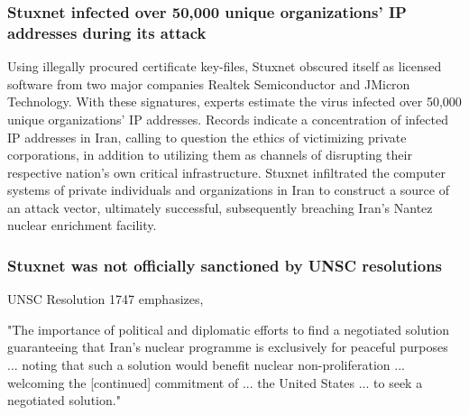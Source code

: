 \documentclass[12pt]{article}
\begin{document}
\begin{multicols}{2}

\subsubsection{Stuxnet infected over 50,000 unique organizations' IP addresses during its attack}

Using illegally procured certificate key-files, Stuxnet obscured itself as licensed software from two major companies Realtek Semiconductor and JMicron Technology. With these signatures, experts estimate the virus infected over 50,000 unique organizations' IP addresses.\cite{lessonsFromStuxnet} Records indicate a concentration of infected IP addresses in Iran, calling to question the ethics of victimizing private corporations, in addition to  utilizing them as channels of disrupting their respective nation's own critical infrastructure. Stuxnet infiltrated the computer systems of private individuals and organizations in Iran to construct a source of an attack vector, ultimately successful, subsequently breaching Iran's Nantez nuclear enrichment facility.\cite{w32.stuxnetDossier} 

\subsubsection{Stuxnet was not officially sanctioned by UNSC resolutions}

UNSC Resolution 1747 emphasizes,
\begin{displayquote}
"The importance of political and diplomatic efforts to find a negotiated solution guaranteeing that Iran’s nuclear programme is exclusively for peaceful purposes ... noting that such a solution would benefit nuclear non-proliferation ... welcoming the [continued] commitment of ... the United States ... to seek a negotiated solution."\cite{resolution1747}
\end{displayquote}


\end{multicols}
\end{document}

